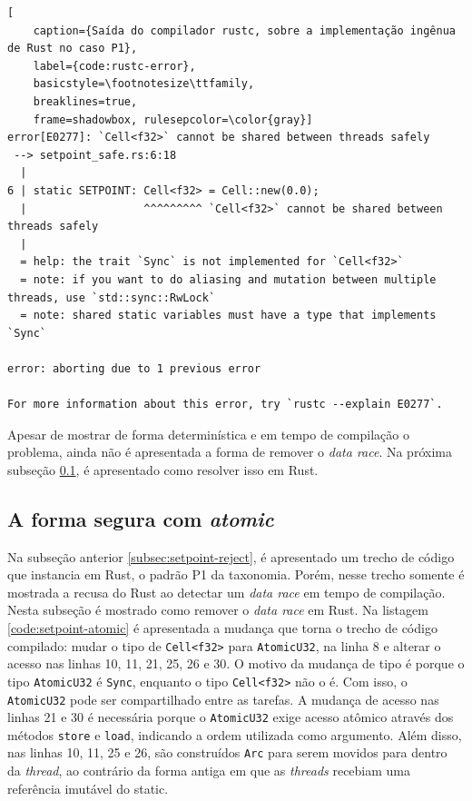 \begin{lstlisting}[
    caption={Saída do compilador rustc, sobre a implementação ingênua de Rust no caso P1},
    label={code:rustc-error},
    basicstyle=\footnotesize\ttfamily,
    breaklines=true,
    frame=shadowbox, rulesepcolor=\color{gray}]
error[E0277]: `Cell<f32>` cannot be shared between threads safely
 --> setpoint_safe.rs:6:18
  |
6 | static SETPOINT: Cell<f32> = Cell::new(0.0);
  |                  ^^^^^^^^^ `Cell<f32>` cannot be shared between threads safely
  |
  = help: the trait `Sync` is not implemented for `Cell<f32>`
  = note: if you want to do aliasing and mutation between multiple threads, use `std::sync::RwLock`
  = note: shared static variables must have a type that implements `Sync`

error: aborting due to 1 previous error

For more information about this error, try `rustc --explain E0277`.
\end{lstlisting}

Apesar de mostrar de forma determinística e em tempo de compilação o problema, ainda não é apresentada a forma de remover o \textit{data race}. Na próxima subseção \ref{subsec:setpoint-atomic}, é apresentado como resolver isso em Rust.

\subsection{A forma segura com \textit{atomic}}
\label{subsec:setpoint-atomic}

Na subseção anterior \ref{subsec:setpoint-reject}, é apresentado um trecho de código que instancia em Rust, o padrão P1 da taxonomia. Porém, nesse trecho somente é mostrada a recusa do Rust ao detectar um \textit{data race} em tempo de compilação. Nesta subseção é mostrado como remover o \textit{data race} em Rust. Na listagem \ref{code:setpoint-atomic} é apresentada a mudança que torna o trecho de código compilado: mudar o tipo de \texttt{Cell<f32>} para \texttt{AtomicU32}, na linha 8 e alterar o acesso nas linhas 10, 11, 21, 25, 26 e 30. O motivo da mudança de tipo é porque o tipo \texttt{AtomicU32} é \texttt{Sync}, enquanto o tipo \texttt{Cell<f32>} não o é. Com isso, o \texttt{AtomicU32} pode ser compartilhado entre as tarefas. A mudança de acesso nas linhas 21 e 30 é necessária porque o \texttt{AtomicU32} exige acesso atômico através dos métodos \texttt{store} e \texttt{load}, indicando a ordem utilizada como argumento. Além disso, nas linhas 10, 11, 25 e 26, são construídos \texttt{Arc} para serem movidos para dentro da \textit{thread}, ao contrário da forma antiga em que as \textit{threads} recebiam uma referência imutável do static.

